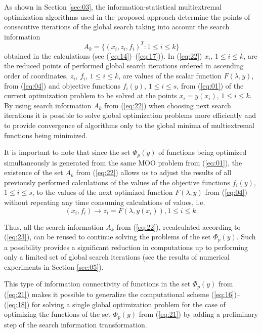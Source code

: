\documentclass[runningheads]{llncs}
\begin{document}
As shown in Section \ref{sec:03}, the information-statistical multiextremal optimization algorithms used in the proposed approach determine the points of consecutive iterations of the global search taking into account the search information
\begin{equation}
\label{eq:22}
A_k=\{(x_i,z_i,f_i )^T:1 \leq i \leq k\}
\end{equation}
obtained in the calculations (see (\ref{eq:14})--(\ref{eq:17})). In (\ref{eq:22}) $x_i$, $1 \leq i \leq k$,  are the reduced points of performed global search iterations ordered in ascending order of coordinates,  $z_i$, $f_i$, $1 \leq i \leq k$, are values of the scalar function $F(\lambda, y)$, from (\ref{eq:04}) and objective functions $f_i(y)$, $1 \leq i \leq s$, from (\ref{eq:01}) of the current optimization problem to be solved at the points $x_i=y(x_i)$, $1 \leq i \leq k$. By using search information $A_k$ from (\ref{eq:22}) when choosing next search iterations it is possible to solve global optimization problems more efficiently and to provide convergence of algorithms only to the global minima of multiextremal functions being minimized.

It is important to note that since the set $\Phi_p(y)$ of functions being optimized  simultaneously is generated from the same MOO problem from (\ref{eq:01}), the existence of the set $A_k$ from (\ref{eq:22}) allows us to adjust the results of all previously performed calculations of the values of the objective functions $f_i(y)$, $1 \leq i \leq s$, to the values of the next optimized function $F(\lambda, y)$ from (\ref{eq:04}) without repeating any time consuming calculations of values, i.e.
\begin{equation}
\label{eq:23}
(x_i,f_i ) \to z_i=F(\lambda, y(x_i)) ,1 \leq i \leq k.
\end{equation}

Thus, all the search information $A_k$ from (\ref{eq:22}), recalculated according to (\ref{eq:23}), can be reused to continue solving the problems of the set $\Phi_p(y)$. Such a possibility provides a significant reduction in computations up to performing only a limited set of global search iterations (see the results of numerical experiments in Section \ref{sec:05}).

     This type of information connectivity of functions in the set $\Phi_p(y)$ from (\ref{eq:21}) makes it possible to generalize the computational scheme (\ref{eq:16})--(\ref{eq:18}) for solving a single global optimization problem for the case of optimizing the functions of the set $\Phi_p(y)$ from (\ref{eq:21}) by adding a preliminary step of the search information  transformation.
\end{document}
